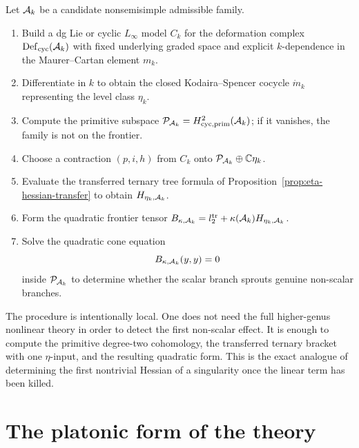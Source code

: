 \begin{procedure}
\label{proc:compute-first-hessian}
Let $\mathcal{A}_k$ be a candidate nonsemisimple admissible family.
\begin{enumerate}[label=\textup{Step~\arabic*:}, leftmargin=3.5em]
\item Build a dg Lie or cyclic $L_\infty$ model $C_k$ for the deformation
complex $\mathrm{Def}_{\mathrm{cyc}}(\mathcal{A}_k)$ with fixed underlying graded space and explicit
$k$-dependence in the Maurer--Cartan element $m_k$.
\item Differentiate in $k$ to obtain the closed Kodaira--Spencer cocycle
$\dot m_k$ representing the level class $\eta_k$.
\item Compute the primitive subspace
$\mathcal{P}_{\mathcal{A}_k}=H^2_{\mathrm{cyc,prim}}(\mathcal{A}_k)$; if it vanishes, the family is not
on the frontier.
\item Choose a contraction $(p,i,h)$ from $C_k$ onto
$\mathcal{P}_{\mathcal{A}_k}\oplus\mathbb{C}\eta_k$.
\item Evaluate the transferred ternary tree formula of
Proposition~\ref{prop:eta-hessian-transfer} to obtain
$H_{\eta_k,\mathcal{A}_k}$.
\item Form the quadratic frontier tensor
$B_{\kappa,\mathcal{A}_k}=l_2^{\mathrm{tr}}+\kappa(\mathcal{A}_k)H_{\eta_k,\mathcal{A}_k}$.
\item Solve the quadratic cone equation
\[
B_{\kappa,\mathcal{A}_k}(y,y)=0
\]
inside $\mathcal{P}_{\mathcal{A}_k}$ to determine whether the scalar branch sprouts genuine
non-scalar branches.
\end{enumerate}
\end{procedure}

\begin{remark}
\label{rem:pragmatic-reading-procedure}
The procedure is intentionally local.  One does not need the full higher-genus
nonlinear theory in order to detect the first non-scalar effect.  It is enough
to compute the primitive degree-two cohomology, the transferred ternary bracket
with one $\eta$-input, and the resulting quadratic form.  This is the exact
analogue of determining the first nontrivial Hessian of a singularity once the
linear term has been killed.
\end{remark}

\section{The platonic form of the theory}
\label{sec:platonic-form}

